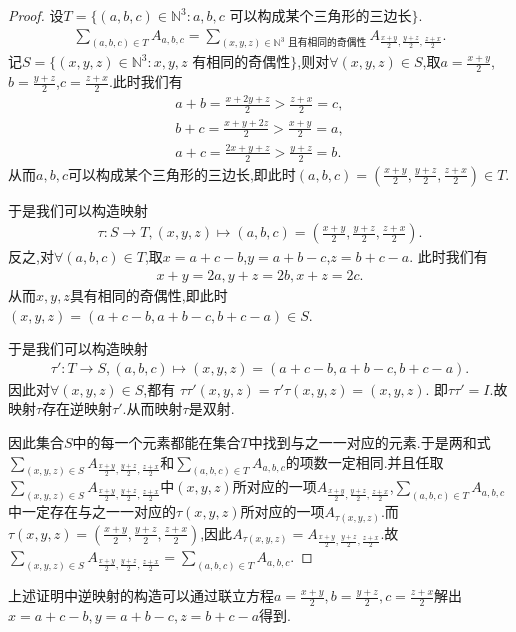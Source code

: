 \documentclass[../../main.tex]{subfiles}%
\begin{document}
\begin{proof}
设\(T = \{ (a,b,c) \in \mathbb{N}^3 : a,b,c\text{ 可以构成某个三角形的三边长}\}\).
\begin{align*}
\sum\limits_{(a,b,c) \in T}A_{a,b,c} = \sum\limits_{(x,y,z) \in \mathbb{N}^3\text{ 且有相同的奇偶性}}A_{\frac{x + y}{2},\frac{y + z}{2},\frac{z + x}{2}}.
\end{align*}
记\(S = \{ (x,y,z) \in \mathbb{N}^3 : x,y,z\text{ 有相同的奇偶性}\}\),则对\(\forall (x,y,z) \in S\),取\(a = \frac{x + y}{2}\),\(b = \frac{y + z}{2}\),\(c = \frac{z + x}{2}\).此时我们有
\begin{align*}
a + b = \frac{x + 2y + z}{2} > \frac{z + x}{2} = c,
\\
b + c = \frac{x + y + 2z}{2} > \frac{x + y}{2} = a,
\\
a + c = \frac{2x + y + z}{2} > \frac{y + z}{2} = b.
\end{align*}
从而\(a,b,c\)可以构成某个三角形的三边长,即此时\((a,b,c) = (\frac{x + y}{2},\frac{y + z}{2},\frac{z + x}{2}) \in T\).

于是我们可以构造映射
\begin{align*}
\tau : S \to T,(x,y,z) \mapsto (a,b,c) = (\frac{x + y}{2},\frac{y + z}{2},\frac{z + x}{2}).
\end{align*}
反之,对\(\forall (a,b,c) \in T\),取\(x = a + c - b\),\(y = a + b - c\),\(z = b + c - a\).
此时我们有
\begin{align*}
x + y = 2a,y + z = 2b,x + z = 2c.
\end{align*}
从而\(x,y,z\)具有相同的奇偶性,即此时\((x,y,z) = (a + c - b,a + b - c,b + c - a) \in S\).

于是我们可以构造映射
\begin{align*}
\tau': T \to S,(a,b,c) \mapsto (x,y,z) = (a + c - b,a + b - c,b + c - a).
\end{align*}
因此对\(\forall (x,y,z) \in S\),都有
\(\tau\tau'(x,y,z) = \tau'\tau(x,y,z) = (x,y,z)\).
即\(\tau\tau' = I\).故映射\(\tau\)存在逆映射\(\tau'\).从而映射\(\tau\)是双射.

因此集合\(S\)中的每一个元素都能在集合\(T\)中找到与之一一对应的元素.于是两和式\(\sum\limits_{(x,y,z) \in S}A_{\frac{x + y}{2},\frac{y + z}{2},\frac{z + x}{2}}\)和\(\sum\limits_{(a,b,c) \in T}A_{a,b,c}\)的项数一定相同.并且任取\(\sum\limits_{(x,y,z) \in S}A_{\frac{x + y}{2},\frac{y + z}{2},\frac{z + x}{2}}\)中\((x,y,z)\)所对应的一项\(A_{\frac{x + y}{2},\frac{y + z}{2},\frac{z + x}{2}}\),\(\sum\limits_{(a,b,c) \in T}A_{a,b,c}\)中一定存在与之一一对应的\(\tau(x,y,z)\)所对应的一项\(A_{\tau(x,y,z)}\).而\(\tau(x,y,z) = (\frac{x + y}{2},\frac{y + z}{2},\frac{z + x}{2})\),因此\(A_{\tau(x,y,z)} = A_{\frac{x + y}{2},\frac{y + z}{2},\frac{z + x}{2}}\).故\(\sum\limits_{(x,y,z) \in S}A_{\frac{x + y}{2},\frac{y + z}{2},\frac{z + x}{2}} = \sum\limits_{(a,b,c) \in T}A_{a,b,c}\). 
\end{proof}
\begin{remark}
上述证明中逆映射的构造可以通过联立方程$a=\frac{x+y}{2},b=\frac{y+z}{2},c=\frac{z+x}{2}$解出$x=a+c-b,y=a+b-c,z=b+c-a$得到.
\end{remark}
\end{document}

